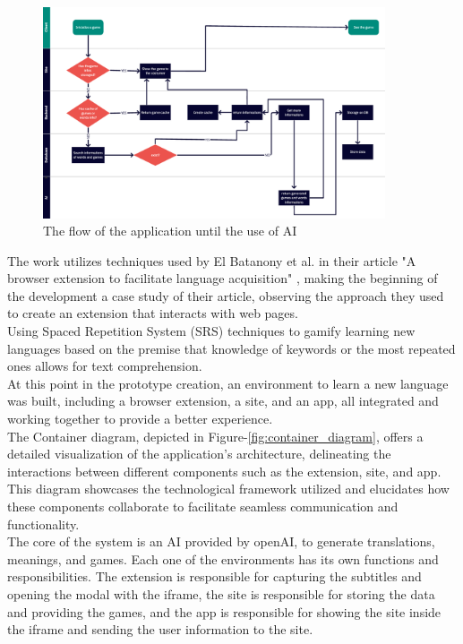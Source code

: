 \documentclass[12pt]{article}
\begin{document}
\begin{figure}[!h]
  \centering
  \caption{
    The flow of the application until the use of AI
  }
  \label{fig:flow_diagram}
  \includegraphics[width=0.9\textwidth]{assets/26.png}
\end{figure}
The work utilizes techniques used by El Batanony et al. in their article "A browser extension to facilitate language acquisition" \cite{ElBatanony21}, making the beginning of the development a case study of their article, observing the approach they used to create an extension that interacts with web pages.  \\
Using Spaced Repetition System (SRS) techniques to gamify learning new languages based on the premise that knowledge of keywords or the most repeated ones allows for text comprehension. \\
At this point in the prototype creation, an environment to learn a new language was built, including a browser extension, a site, and an app, all integrated and working together to provide a better experience. \\
The Container diagram, depicted in Figure-\ref{fig:container_diagram}, offers a detailed visualization of the application's architecture, delineating the interactions between different components such as the extension, site, and app. This diagram showcases the technological framework utilized and elucidates how these components collaborate to facilitate seamless communication and functionality. \\
The core of the system is an AI provided by openAI, to generate translations, meanings, and games. Each one of the environments has its own functions and responsibilities. The extension is responsible for capturing the subtitles and opening the modal with the iframe, the site is responsible for storing the data and providing the games, and the app is responsible for showing the site inside the iframe and sending the user information to the site. \\
\end{document}
